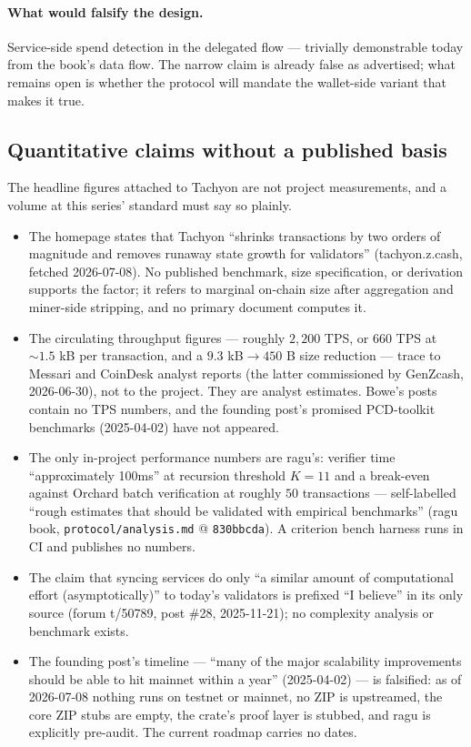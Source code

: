 \documentclass[11pt,a4paper]{article}
\theoremstyle{definition}
\begin{document}
\paragraph{What would falsify the design.} Service-side spend detection in
the delegated flow --- trivially demonstrable today from the book's data
flow. The narrow claim is already false as advertised; what remains open is
whether the protocol will mandate the wallet-side variant that makes it
true.

\subsection{Quantitative claims without a published basis}
\label{sec:tachyon-figures}

The headline figures attached to Tachyon are not project measurements, and
a volume at this series' standard must say so plainly.

\begin{itemize}
\item The homepage states that Tachyon ``shrinks transactions by two orders
of magnitude and removes runaway state growth for validators''
(tachyon.z.cash, fetched 2026-07-08). No published benchmark, size
specification, or derivation supports the factor; it refers to marginal
on-chain size after aggregation and miner-side stripping, and no primary
document computes it.
\item The circulating throughput figures --- roughly $2{,}200$ TPS, or
$660$ TPS at ${\sim}1.5$ kB per transaction, and a $9.3$ kB${}\to{}450$ B
size reduction --- trace to Messari and CoinDesk analyst reports
(the latter commissioned by GenZcash, 2026-06-30), not to the project.
They are analyst estimates. Bowe's posts contain no TPS numbers, and the
founding post's promised PCD-toolkit benchmarks (2025-04-02) have not
appeared.
\item The only in-project performance numbers are \textsf{ragu}'s: verifier
time ``approximately 100ms'' at recursion threshold $K = 11$ and a
break-even against Orchard batch verification at roughly $50$ transactions
--- self-labelled ``rough estimates that should be validated with empirical
benchmarks'' (\textsf{ragu} book, \texttt{protocol/analysis.md} @
\texttt{830bbcda}). A criterion bench harness runs in CI and publishes no
numbers.
\item The claim that syncing services do only ``a similar amount of
computational effort (asymptotically)'' to today's validators is prefixed
``I believe'' in its only source (forum t/50789, post \#28, 2025-11-21);
no complexity analysis or benchmark exists.
\item The founding post's timeline --- ``many of the major scalability
improvements should be able to hit mainnet within a year'' (2025-04-02) ---
is falsified: as of 2026-07-08 nothing runs on testnet or mainnet, no ZIP
is upstreamed, the core ZIP stubs are empty, the crate's proof layer is
stubbed, and \textsf{ragu} is explicitly pre-audit. The current roadmap
carries no dates.
\end{itemize}
\end{document}
